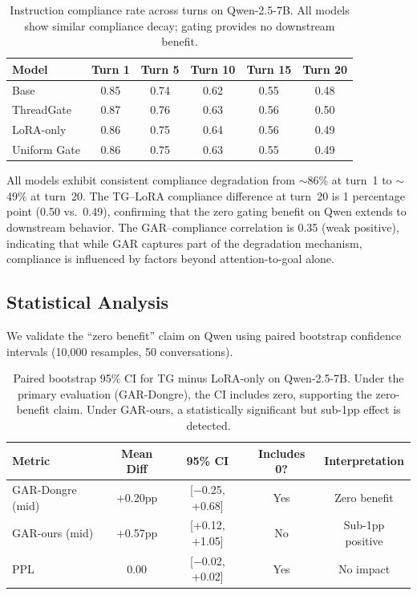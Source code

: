\documentclass[11pt,a4paper]{article}
\begin{document}
\begin{table}[h]
\centering
\small
\caption{Instruction compliance rate across turns on Qwen-2.5-7B. All models show similar compliance decay; gating provides no downstream benefit.}
\label{tab:compliance}
\begin{tabular}{lccccc}
\toprule
\textbf{Model} & \textbf{Turn 1} & \textbf{Turn 5} & \textbf{Turn 10} & \textbf{Turn 15} & \textbf{Turn 20} \\
\midrule
Base & 0.85 & 0.74 & 0.62 & 0.55 & 0.48 \\
ThreadGate & 0.87 & 0.76 & 0.63 & 0.56 & 0.50 \\
LoRA-only & 0.86 & 0.75 & 0.64 & 0.56 & 0.49 \\
Uniform Gate & 0.86 & 0.75 & 0.63 & 0.55 & 0.49 \\
\bottomrule
\end{tabular}
\end{table}

All models exhibit consistent compliance degradation from $\sim$86\% at turn~1 to $\sim$49\% at turn~20.
The TG--LoRA compliance difference at turn~20 is 1 percentage point (0.50 vs.\ 0.49), confirming that the zero gating benefit on Qwen extends to downstream behavior.
The GAR--compliance correlation is 0.35 (weak positive), indicating that while GAR captures part of the degradation mechanism, compliance is influenced by factors beyond attention-to-goal alone.

\subsection{Statistical Analysis}
\label{sec:stats}

We validate the ``zero benefit'' claim on Qwen using paired bootstrap confidence intervals (10,000 resamples, 50 conversations).

\begin{table}[h]
\centering
\small
\caption{Paired bootstrap 95\% CI for TG minus LoRA-only on Qwen-2.5-7B. Under the primary evaluation (GAR-Dongre), the CI includes zero, supporting the zero-benefit claim. Under GAR-ours, a statistically significant but sub-1pp effect is detected.}
\label{tab:bootstrap}
\begin{tabular}{lcccc}
\toprule
\textbf{Metric} & \textbf{Mean Diff} & \textbf{95\% CI} & \textbf{Includes 0?} & \textbf{Interpretation} \\
\midrule
GAR-Dongre (mid) & +0.20pp & [$-$0.25, +0.68] & Yes & Zero benefit \\
GAR-ours (mid) & +0.57pp & [+0.12, +1.05] & No & Sub-1pp positive \\
PPL & 0.00 & [$-$0.02, +0.02] & Yes & No impact \\
\bottomrule
\end{tabular}
\end{table}
\end{document}
